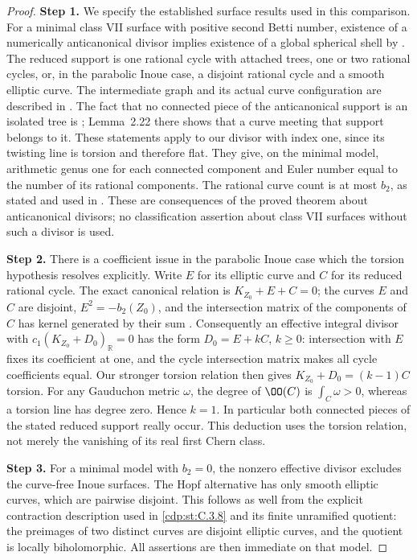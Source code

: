 \begin{proof}
\noindent\textbf{Step 1.} We specify the established surface results used in this
comparison. For a minimal class VII surface with positive
second Betti number, existence of a numerically
anticanonical divisor implies existence of a global
spherical shell by
\cite[Theorem~0.2, Proposition~2.29 and Theorem~2.38]{Dloussky2006}.
The reduced support is one rational cycle with attached
trees, one or two rational cycles, or, in the parabolic
Inoue case, a disjoint rational cycle and a smooth elliptic
curve. The intermediate graph and its actual curve
configuration are described in
\cite[\S1, pp.~284--285, and \S3, p.~296]{DOT2003}.
The fact that no connected piece of the anticanonical
support is an isolated tree is
\cite[Corollary~2.25 and Proposition~2.27]{Dloussky2006};
Lemma~2.22 there shows that a curve meeting that support
belongs to it. These statements apply to our divisor with
index one, since its twisting line is torsion and therefore
flat. They give, on the minimal model, arithmetic genus
one for each connected component and Euler number equal
to the number of its rational components. The rational
curve count is at most $b_2$, as stated and used in
\cite[Introduction, p.~283]{DOT2003}.
These are consequences of the proved theorem about
anticanonical divisors; no classification assertion about
class VII surfaces without such a divisor is used.

\noindent\textbf{Step 2.} There is a coefficient issue in the parabolic Inoue case
which the torsion hypothesis resolves explicitly. Write
$E$ for its elliptic curve and $C$ for its reduced rational
cycle. The exact canonical relation is
$K_{Z_0}+E+C=0$; the curves $E$ and $C$ are disjoint,
$E^2=-b_2(Z_0)$, and the intersection matrix of the
components of $C$ has kernel generated by their sum
\cite[Lemma~2.22 and the following paragraph; Proposition~2.27]{Dloussky2006}.
Consequently an effective integral divisor with
$c_1(K_{Z_0}+D_0)_{\mathbb R}=0$ has the form
$D_0=E+kC$, $k\ge0$: intersection with $E$ fixes its
coefficient at one, and the cycle intersection matrix
makes all cycle coefficients equal. Our stronger
torsion relation then gives
$K_{Z_0}+D_0=(k-1)C$ torsion. For any Gauduchon metric
$\omega$, the degree of $\OO(C)$ is
$\int_C\omega>0$, whereas a torsion line has degree
zero. Hence $k=1$. In particular both connected
pieces of the stated reduced support really occur.
This deduction uses the torsion relation, not merely
the vanishing of its real first Chern class.

\noindent\textbf{Step 3.} For a minimal model with $b_2=0$, the nonzero effective
divisor excludes the curve-free Inoue surfaces. The
Hopf alternative has only smooth elliptic curves, which
are pairwise disjoint. This follows as well from the
explicit contraction description used in \ref{cdp:st:C.3.8} and its
finite unramified quotient: the preimages of two distinct
curves are disjoint elliptic curves, and the quotient
is locally biholomorphic. All assertions are then
immediate on that model.


\end{proof}
